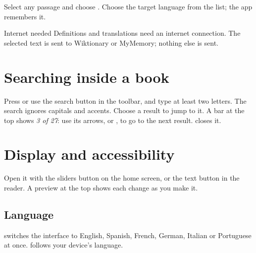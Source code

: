 \documentclass[11pt]{article}
\begin{document}
Select any passage and choose . Choose the target language from the list; the app
remembers it.

\begin{note}{Internet needed}
Definitions and translations need an internet connection. The selected text is sent to
Wiktionary or MyMemory; nothing else is sent.
\end{note}

\section{Searching inside a book}\label{sec:search}

Press  or use the search button in the toolbar, and type at least two letters. The
search ignores capitals and accents. Choose a result to jump to it. A bar at the top shows
\emph{3 of 27}: use its arrows, or , to go to the next result.  closes it.

\section{Display and accessibility}\label{sec:display}

Open it with the sliders button on the home screen, or the text button in the reader. A preview
at the top shows each change as you make it.


\subsection{Language}
 switches the interface to English, Spanish, French, German, Italian or
Portuguese at once.  follows your device's language.
\end{document}
